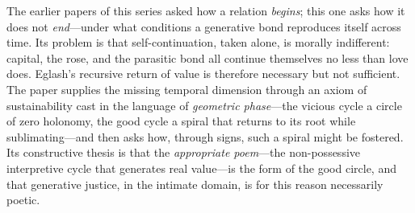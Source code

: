 \noindent
The earlier papers of this series asked how a relation \emph{begins}; this one asks how it does not \emph{end}---under what conditions a generative bond reproduces itself across time. Its problem is that self-continuation, taken alone, is morally indifferent: capital, the rose, and the parasitic bond all continue themselves no less than love does. Eglash's recursive return of value is therefore necessary but not sufficient. The paper supplies the missing temporal dimension through an axiom of sustainability cast in the language of \emph{geometric phase}---the vicious cycle a circle of zero holonomy, the good cycle a spiral that returns to its root while sublimating---and then asks how, through signs, such a spiral might be fostered. Its constructive thesis is that the \emph{appropriate poem}---the non-possessive interpretive cycle that generates real value---is the form of the good circle, and that generative justice, in the intimate domain, is for this reason necessarily poetic.
